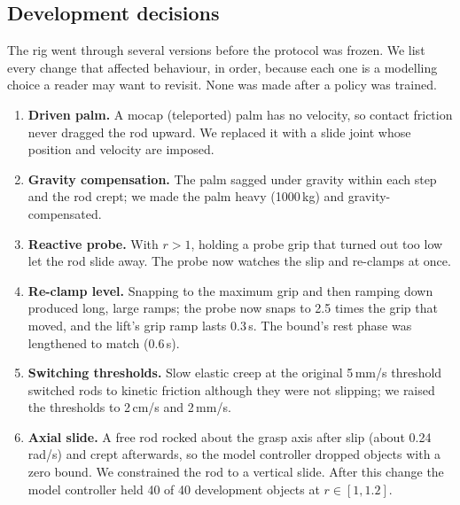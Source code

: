 \subsection{Development decisions}\label{app:devlog}
The rig went through several versions before the protocol was frozen. We list every change that affected behaviour, in
order, because each one is a modelling choice a reader may want to revisit. None was made after a policy was trained.
\begin{enumerate}[leftmargin=1.5em]
\item \textbf{Driven palm.} A mocap (teleported) palm has no velocity, so contact friction never dragged the rod upward.
We replaced it with a slide joint whose position and velocity are imposed.
\item \textbf{Gravity compensation.} The palm sagged under gravity within each step and the rod crept; we made the palm heavy
(1000\,kg) and gravity-compensated.
\item \textbf{Reactive probe.} With $r>1$, holding a probe grip that turned out too low let the rod slide away. The probe now
watches the slip and re-clamps at once.
\item \textbf{Re-clamp level.} Snapping to the maximum grip and then ramping down produced long, large ramps; the probe now
snaps to 2.5 times the grip that moved, and the lift's grip ramp lasts 0.3\,s. The bound's rest phase was lengthened to
match (0.6\,s).
\item \textbf{Switching thresholds.} Slow elastic creep at the original 5\,mm/s threshold switched rods to kinetic friction
although they were not slipping; we raised the thresholds to 2\,cm/s and 2\,mm/s.
\item \textbf{Axial slide.} A free rod rocked about the grasp axis after slip (about 0.24\,rad/s) and crept afterwards, so the
model controller dropped objects with a zero bound. We constrained the rod to a vertical slide. After this change the model
controller held 40 of 40 development objects at $r\in[1,1.2]$.
\end{enumerate}

